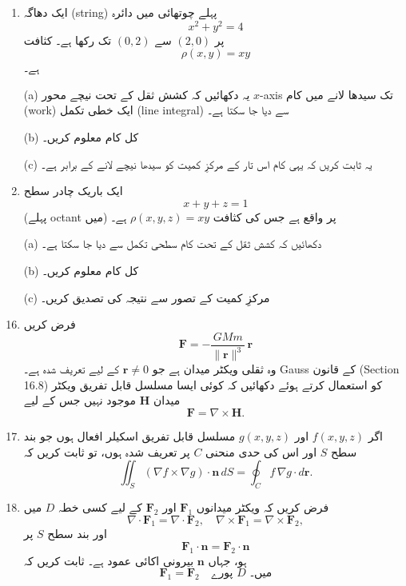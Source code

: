 \begin{enumerate}
\begin{enumerate}
\item  
ایک دھاگہ (string) پہلے چوتھائی میں دائرہ
\[
x^2 + y^2 = 4
\]
پر \((2,0)\) سے \((0,2)\) تک رکھا ہے۔ کثافت
\[
\rho(x,y) = xy
\]
ہے۔

(a) یہ دکھائیں کہ کشش ثقل کے تحت نیچے محور \(x\)-axis تک سیدھا لانے میں کام (work) ایک خطی تکمل (line integral) سے دیا جا سکتا ہے۔

(b) کل کام معلوم کریں۔

(c) یہ ثابت کریں کہ یہی کام اس تار کے مرکزِ کمیت کو سیدھا نیچے لانے کے برابر ہے۔

\item  
ایک باریک چادر سطح
\[
x + y + z = 1
\]
(پہلے octant میں) پر واقع ہے جس کی کثافت \( \rho(x,y,z) = xy \) ہے۔

(a) دکھائیں کہ کشش ثقل کے تحت کام سطحی تکمل سے دیا جا سکتا ہے۔

(b) کل کام معلوم کریں۔

(c) مرکزِ کمیت کے تصور سے نتیجہ کی تصدیق کریں۔

\end{enumerate}






\begin{enumerate}
\setcounter{enumi}{15}

\item  
فرض کریں
\[
\mathbf{F} = -\frac{GMm}{\lVert \mathbf{r} \rVert^3}\,\mathbf{r}
\]
وہ ثقلی ویکٹر میدان ہے جو \( \mathbf{r} \neq 0 \) کے لیے تعریف شدہ ہے۔ Gauss کے قانون (Section 16.8) کو استعمال کرتے ہوئے دکھائیں کہ کوئی ایسا مسلسل قابل تفریق ویکٹر میدان \( \mathbf{H} \) موجود نہیں جس کے لیے
\[
\mathbf{F} = \nabla \times \mathbf{H}.
\]

\item  
اگر \(f(x,y,z)\) اور \(g(x,y,z)\) مسلسل قابل تفریق اسکیلر افعال ہوں جو بند سطح \(S\) اور اس کی حدی منحنی \(C\) پر تعریف شدہ ہوں، تو ثابت کریں کہ
\[
\iint_S (\nabla f \times \nabla g)\cdot \mathbf{n}\, dS
=
\oint_C f\, \nabla g \cdot d\mathbf{r}.
\]

\item  
فرض کریں کہ ویکٹر میدانوں \( \mathbf{F}_1 \) اور \( \mathbf{F}_2 \) کے لیے کسی خطہ \(D\) میں
\[
\nabla \cdot \mathbf{F}_1 = \nabla \cdot \mathbf{F}_2,\quad
\nabla \times \mathbf{F}_1 = \nabla \times \mathbf{F}_2,
\]
اور بند سطح \(S\) پر
\[
\mathbf{F}_1 \cdot \mathbf{n} = \mathbf{F}_2 \cdot \mathbf{n}
\]
ہو، جہاں \( \mathbf{n} \) بیرونی اکائی عمود ہے۔ ثابت کریں کہ
\[
\mathbf{F}_1 = \mathbf{F}_2 \quad \text{پورے } D \text{ میں۔}
\]


\end{enumerate}
\end{enumerate}
